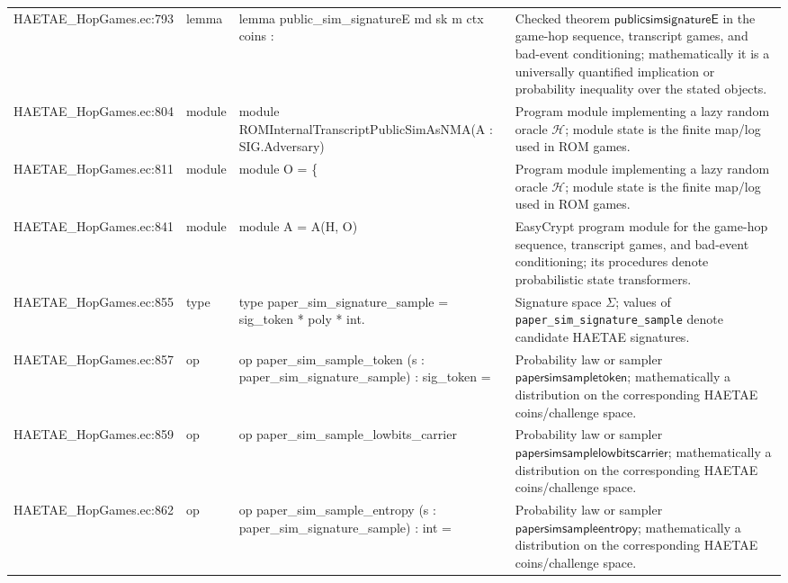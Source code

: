 \documentclass[10pt]{article}
\newcommand{\EC}[1]{\texttt{#1}}
\begin{document}
\begin{longtable}{L{0.11\textwidth}L{0.055\textwidth}L{0.385\textwidth}L{0.41\textwidth}}
HAETAE\_\allowbreak{}HopGames.\allowbreak{}ec:\allowbreak{}793 & lemma & {\ttfamily\scriptsize lemma public\_\allowbreak{}sim\_\allowbreak{}signatureE md sk m ctx coins :} & Checked theorem $\mathsf{publicsimsignatureE}$ in the game-hop sequence, transcript games, and bad-event conditioning; mathematically it is a universally quantified implication or probability inequality over the stated objects. \\
HAETAE\_\allowbreak{}HopGames.\allowbreak{}ec:\allowbreak{}804 & module & {\ttfamily\scriptsize module ROMInternalTranscriptPublicSimAsNMA(A : SIG.Adversary)} & Program module implementing a lazy random oracle $\mathcal H$; module state is the finite map/log used in ROM games. \\
HAETAE\_\allowbreak{}HopGames.\allowbreak{}ec:\allowbreak{}811 & module & {\ttfamily\scriptsize module O = \{} & Program module implementing a lazy random oracle $\mathcal H$; module state is the finite map/log used in ROM games. \\
HAETAE\_\allowbreak{}HopGames.\allowbreak{}ec:\allowbreak{}841 & module & {\ttfamily\scriptsize module A = A(H, O)} & EasyCrypt program module for the game-hop sequence, transcript games, and bad-event conditioning; its procedures denote probabilistic state transformers. \\
HAETAE\_\allowbreak{}HopGames.\allowbreak{}ec:\allowbreak{}855 & type & {\ttfamily\scriptsize type paper\_\allowbreak{}sim\_\allowbreak{}signature\_\allowbreak{}sample = sig\_\allowbreak{}token * poly * int.} & Signature space $\Sigma$; values of \EC{paper\_sim\_signature\_sample} denote candidate HAETAE signatures. \\
HAETAE\_\allowbreak{}HopGames.\allowbreak{}ec:\allowbreak{}857 & op & {\ttfamily\scriptsize op paper\_\allowbreak{}sim\_\allowbreak{}sample\_\allowbreak{}token (s : paper\_\allowbreak{}sim\_\allowbreak{}signature\_\allowbreak{}sample) : sig\_\allowbreak{}token =} & Probability law or sampler $\mathsf{papersimsampletoken}$; mathematically a distribution on the corresponding HAETAE coins/challenge space. \\
HAETAE\_\allowbreak{}HopGames.\allowbreak{}ec:\allowbreak{}859 & op & {\ttfamily\scriptsize op paper\_\allowbreak{}sim\_\allowbreak{}sample\_\allowbreak{}lowbits\_\allowbreak{}carrier} & Probability law or sampler $\mathsf{papersimsamplelowbitscarrier}$; mathematically a distribution on the corresponding HAETAE coins/challenge space. \\
HAETAE\_\allowbreak{}HopGames.\allowbreak{}ec:\allowbreak{}862 & op & {\ttfamily\scriptsize op paper\_\allowbreak{}sim\_\allowbreak{}sample\_\allowbreak{}entropy (s : paper\_\allowbreak{}sim\_\allowbreak{}signature\_\allowbreak{}sample) : int =} & Probability law or sampler $\mathsf{papersimsampleentropy}$; mathematically a distribution on the corresponding HAETAE coins/challenge space. \\

\end{longtable}
\end{document}
